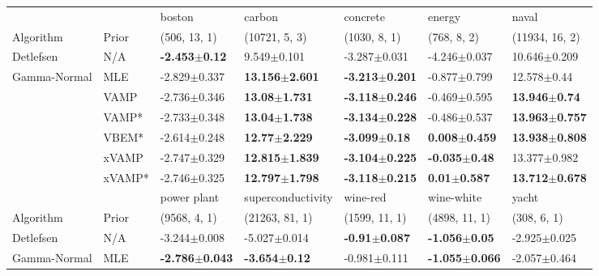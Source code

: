\begin{tabular}{lllllll}
\toprule
             &        &                    boston &                     carbon &                   concrete &                    energy &                      naval \\
Algorithm & Prior& (506, 13, 1)& (10721, 5, 3)& (1030, 8, 1)& (768, 8, 2)& (11934, 16, 2)\\
\midrule
Detlefsen & N/A &  \textbf{-2.453$\pm$0.12} &            9.549$\pm$0.101 &           -3.287$\pm$0.031 &          -4.246$\pm$0.037 &           10.646$\pm$0.209 \\
Gamma-Normal & MLE &          -2.829$\pm$0.337 &  \textbf{13.156$\pm$2.601} &  \textbf{-3.213$\pm$0.201} &          -0.877$\pm$0.799 &            12.578$\pm$0.44 \\
             & VAMP &          -2.736$\pm$0.346 &   \textbf{13.08$\pm$1.731} &  \textbf{-3.118$\pm$0.246} &          -0.469$\pm$0.595 &   \textbf{13.946$\pm$0.74} \\
             & VAMP* &          -2.733$\pm$0.348 &   \textbf{13.04$\pm$1.738} &  \textbf{-3.134$\pm$0.228} &          -0.486$\pm$0.537 &  \textbf{13.963$\pm$0.757} \\
             & VBEM* &          -2.614$\pm$0.248 &   \textbf{12.77$\pm$2.229} &   \textbf{-3.099$\pm$0.18} &  \textbf{0.008$\pm$0.459} &  \textbf{13.938$\pm$0.808} \\
             & xVAMP &          -2.747$\pm$0.329 &  \textbf{12.815$\pm$1.839} &  \textbf{-3.104$\pm$0.225} &  \textbf{-0.035$\pm$0.48} &           13.377$\pm$0.982 \\
             & xVAMP* &          -2.746$\pm$0.325 &  \textbf{12.797$\pm$1.798} &  \textbf{-3.118$\pm$0.215} &   \textbf{0.01$\pm$0.587} &  \textbf{13.712$\pm$0.678} \\
\midrule
             &        &                power plant &          superconductivity &                  wine-red &                 wine-white &                      yacht \\
Algorithm & Prior& (9568, 4, 1)& (21263, 81, 1)& (1599, 11, 1)& (4898, 11, 1)& (308, 6, 1)\\
\midrule
Detlefsen & N/A &           -3.244$\pm$0.008 &           -5.027$\pm$0.014 &  \textbf{-0.91$\pm$0.087} &   \textbf{-1.056$\pm$0.05} &           -2.925$\pm$0.025 \\
Gamma-Normal & MLE &  \textbf{-2.786$\pm$0.043} &   \textbf{-3.654$\pm$0.12} &          -0.981$\pm$0.111 &  \textbf{-1.055$\pm$0.066} &           -2.057$\pm$0.464 \\

\end{tabular}
